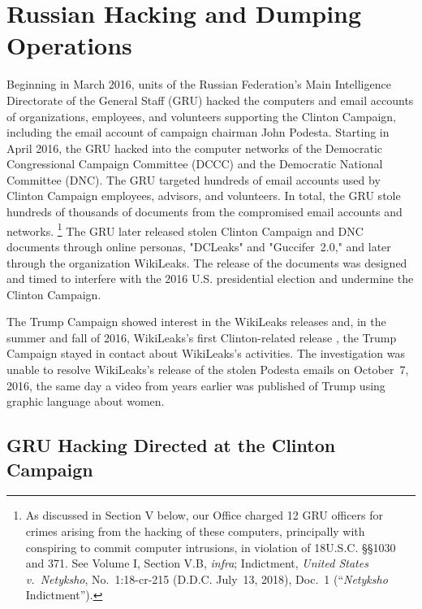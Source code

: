 \section{Russian Hacking and Dumping Operations}

Beginning in March 2016, units of the Russian Federation's Main Intelligence Directorate of the General Staff (GRU) hacked the computers and email accounts of organizations, employees, and volunteers supporting the Clinton Campaign, including the email account of campaign chairman John Podesta.
Starting in April 2016, the GRU hacked into the computer networks of the Democratic Congressional Campaign Committee (DCCC) and the Democratic National Committee (DNC).
The GRU targeted hundreds of email accounts used by Clinton Campaign employees, advisors, and volunteers.
In total, the GRU stole hundreds of thousands of documents from the compromised email accounts and networks.%
\footnote{As discussed in Section V below, our Office charged 12 GRU officers for crimes arising from the hacking of these computers, principally with conspiring to commit computer intrusions, in violation of
18U.S.C. \S\S 1030 and 371.
See Volume I, Section V.B, \textit{infra};
Indictment, \textit{United States v.\ Netyksho}, No.~1:18-cr-215 (D.D.C. July~13, 2018), Doc.~1 (“\textit{Netyksho} Indictment”).}
The GRU later released stolen Clinton Campaign and DNC documents through online personas, "DCLeaks" and "Guccifer~2.0," and later through the organization WikiLeaks.
The release of the documents was designed and timed to interfere with the 2016 U.S. presidential election and undermine the Clinton Campaign.

The Trump Campaign showed interest in the WikiLeaks releases and, in the summer and fall of 2016, 
WikiLeaks's first Clinton-related release , the Trump Campaign stayed in contact  about WikiLeaks's activities.
The investigation was unable to resolve 
WikiLeaks's release of the stolen Podesta emails on October~7, 2016, the same day a video from years earlier was published of Trump using graphic language about women.

\subsection{GRU Hacking Directed at the Clinton Campaign}


